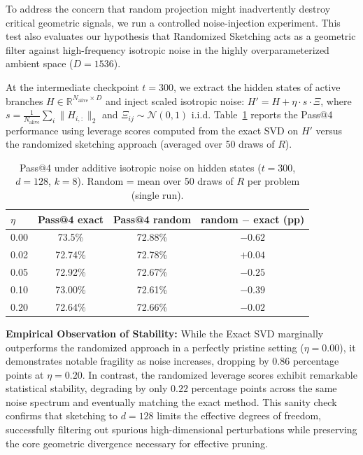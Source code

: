 \documentclass[11pt]{article}
\begin{document}
To address the concern that random projection might inadvertently destroy critical geometric signals, we run a controlled noise-injection experiment. This test also evaluates our hypothesis that Randomized Sketching acts as a geometric filter against high-frequency isotropic noise in the highly overparameterized ambient space ($D=1536$). 

At the intermediate checkpoint $t{=}300$, we extract the hidden states of active branches $H\in\mathbb{R}^{N_{\text{alive}}\times D}$ and inject scaled isotropic noise: $H' = H + \eta\cdot s \cdot \Xi$, where $s=\frac{1}{N_{\text{alive}}}\sum_i \|H_{i,:}\|_2$ and $\Xi_{ij}\sim\mathcal{N}(0,1)$ i.i.d. Table~\ref{tab:noise-injection} reports the Pass@4 performance using leverage scores computed from the exact SVD on $H'$ versus the randomized sketching approach (averaged over 50 draws of $R$).

\begin{table}[ht]
\centering
\caption{Pass@4 under additive isotropic noise on hidden states ($t{=}300$, $d{=}128$, $k{=}8$). Random = mean over 50 draws of $R$ per problem (single run).}
\label{tab:noise-injection}
\begin{tabular}{lccc}
\toprule
\textbf{$\eta$} & \textbf{Pass@4 exact} & \textbf{Pass@4 random} & \textbf{random $-$ exact (pp)} \\
\midrule
0.00 & 73.5\% & 72.88\% & $-0.62$ \\
0.02 & 72.74\% & 72.78\% & $+0.04$ \\
0.05 & 72.92\% & 72.67\% & $-0.25$ \\
0.10 & 73.00\% & 72.61\% & $-0.39$ \\
0.20 & 72.64\% & 72.66\% & $-0.02$ \\
\bottomrule
\end{tabular}
\end{table}


\textbf{Empirical Observation of Stability:} 
While the Exact SVD marginally outperforms the randomized approach in a perfectly pristine setting ($\eta=0.00$), it demonstrates notable fragility as noise increases, dropping by $0.86$ percentage points at $\eta=0.20$. In contrast, the randomized leverage scores exhibit remarkable statistical stability, degrading by only $0.22$ percentage points across the same noise spectrum and eventually matching the exact method. This sanity check confirms that sketching to $d=128$ limits the effective degrees of freedom, successfully filtering out spurious high-dimensional perturbations while preserving the core geometric divergence necessary for effective pruning.
\end{document}
